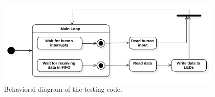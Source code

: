 \begin{figure}[h!]
	\centering
	\includegraphics[width = 1.1\linewidth]{graphics/StateDiagram_CanStackTestCode.pdf}
	\caption{Behavioral diagram of the testing code.}
	\label{fig:CAN_Testing_StateDiagr_Code}
\end{figure}

